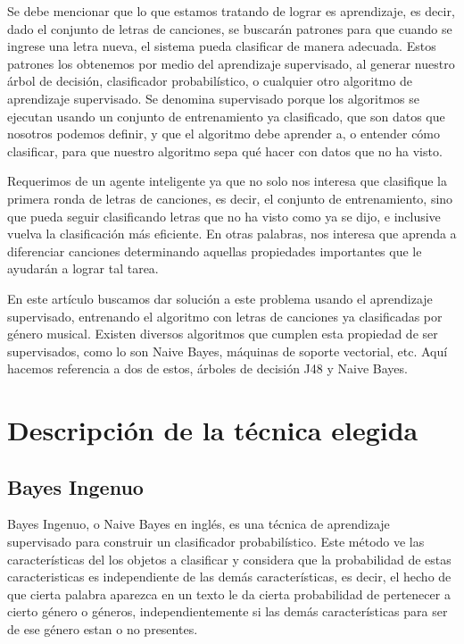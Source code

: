\documentclass[spanish,11pt,letterpaper]{article}
\begin{document}
Se debe mencionar que lo que estamos tratando de lograr es aprendizaje, es decir, dado el conjunto
de letras de canciones, se buscarán patrones para que cuando se ingrese una letra nueva, el sistema
pueda clasificar de manera adecuada. Estos patrones los obtenemos por medio del aprendizaje
supervisado, al generar nuestro árbol de decisión, clasificador probabilístico,
o cualquier otro algoritmo de aprendizaje
supervisado. Se denomina supervisado porque los algoritmos se ejecutan usando un conjunto de
entrenamiento ya clasificado, que son datos que nosotros podemos definir, y que el algoritmo debe
aprender a, o entender cómo clasificar, para que nuestro algoritmo sepa qué hacer con datos
que no ha visto.

Requerimos de un agente inteligente ya que no solo nos interesa que clasifique la primera
ronda de letras de canciones, es decir, el conjunto de entrenamiento, sino que pueda seguir
clasificando letras que no ha visto como ya se dijo, e inclusive vuelva la clasificación
más eficiente. En otras palabras, nos interesa que aprenda a diferenciar canciones determinando
aquellas propiedades importantes que le ayudarán a lograr tal tarea.

En este artículo buscamos dar solución a este problema usando el aprendizaje supervisado, entrenando
el algoritmo con letras de canciones ya clasificadas por género musical. Existen
diversos algoritmos que cumplen esta propiedad de ser supervisados, como lo son Naive
Bayes, máquinas de soporte vectorial, etc. Aquí hacemos referencia a dos de estos,
árboles de decisión J48 y Naive Bayes.

\section{Descripción de la técnica elegida}

\subsection{Bayes Ingenuo}

Bayes Ingenuo, o Naive Bayes en inglés, es una técnica de aprendizaje supervisado para construir un
clasificador probabilístico. Este método ve las características del los objetos a clasificar y considera que la
probabilidad de estas caracteristicas es independiente de las demás características, es decir, el
hecho de que cierta palabra aparezca en un texto le da cierta probabilidad de pertenecer a cierto
género o géneros, independientemente si las demás características para ser de ese género estan o no
presentes.
\end{document}
